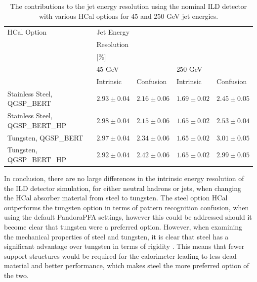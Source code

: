 \begin{table}[h!]
\centering
\begin{tabular}{ l l l l l }
\hline
HCal Option & Jet Energy & & & \\
 & Resolution & & & \\
 & [\%] & & & \\
 & 45 GeV & & 250 GeV & \\
 & Intrinsic & Confusion & Intrinsic & Confusion \\
\hline
Stainless Steel, QGSP\_BERT & $2.93 \pm 0.04$ & $2.16 \pm 0.06$ & $1.69 \pm 0.02$ &$2.45 \pm 0.05$ \\
Stainless Steel, QGSP\_BERT\_HP & $2.98 \pm 0.04$ &$2.15 \pm 0.06$ &$1.65 \pm 0.02$ &$2.53 \pm 0.04$ \\
Tungsten, QGSP\_BERT & $2.97 \pm 0.04$ & $2.34 \pm 0.06$ & $1.65 \pm 0.02$ & $3.01 \pm 0.05$ \\
Tungsten, QGSP\_BERT\_HP & $2.92 \pm 0.04$ & $2.42 \pm 0.06$ & $1.65 \pm 0.02$ & $2.99 \pm 0.05$ \\
\hline
\end{tabular}
\caption[The contributions to the jet energy resolution using the nominal ILD detector with various HCal options for 45 and 250 GeV jet energies.]{The contributions to the jet energy resolution using the nominal ILD detector with various HCal options for 45 and 250 GeV jet energies.}
\label{table:jerbdhcalabsmaterial}
\end{table}

In conclusion, there are no large differences in the intrinsic energy resolution of the ILD detector simulation, for either neutral hadrons or jets, when changing the HCal absorber material from steel to tungsten.  The steel option HCal outperforms the tungsten option in terms of pattern recognition confusion, when using the default PandoraPFA settings, however this could be addressed should it become clear that tungsten were a preferred option.  However, when examining the mechanical properties of steel and tungsten, it is clear that steel has a significant advantage over tungsten in terms of rigidity \cite{Linssen:2012hp}.  This means that fewer support structures would be required for the calorimeter leading to less dead material and better performance, which makes steel the more preferred option of the two.


